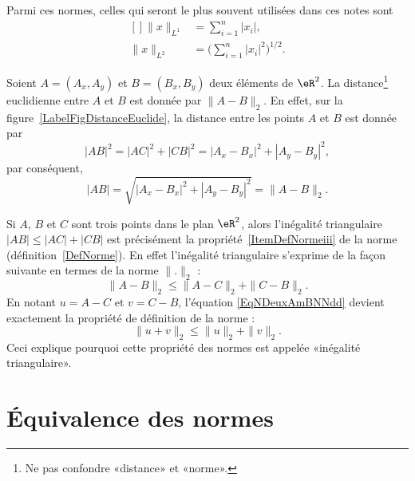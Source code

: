 Parmi ces normes, celles qui seront le plus souvent utilisées dans ces notes sont
\begin{equation}
	\begin{aligned}[]
		\| x \|_{L^1}&=\sum_{i=1}^n| x_i |,\\
		\| x \|_{L^2}&=\Big( \sum_{i=1}^n| x_i |^2 \Big)^{1/2}.
	\end{aligned}
\end{equation}

\newcommand{\CaptionFigDistanceEuclide}{La \emph{norme} euclidienne induit la \emph{distance} euclidienne. D'où son nom. Le point $C$ est construit aux coordonnées $(A_x,B_y)$.}


Soient $A=(A_x,A_y)$ et $B=(B_x,B_y)$ deux éléments de $\eR^2$. La distance\footnote{Ne pas confondre «distance» et «norme».} euclidienne entre $A$ et $B$ est donnée par $\| A-B \|_2$. En effet, sur la figure~\ref{LabelFigDistanceEuclide}, la distance entre les points $A$ et $B$ est donnée par
\begin{equation}
	| AB |^2=| AC |^2+| CB |^2=| A_x-B_x |^2+| A_y-B_y |^2,
\end{equation}
par conséquent,
\begin{equation}
	| AB |=\sqrt{| A_x-B_x |^2+| A_y-B_y |^2}=\| A-B \|_2.
\end{equation}

\begin{remark}
	Si $A$, $B$ et $C$ sont trois points dans le plan $\eR^2$, alors l'inégalité triangulaire $| AB |\leq| AC |+| CB |$ est précisément la propriété~\ref{ItemDefNormeiii} de la norme (définition~\ref{DefNorme}). En effet l'inégalité triangulaire s'exprime de la façon suivante en termes de la norme $\| . \|_2$ :
	\begin{equation}	\label{EqNDeuxAmBNNdd}
		\| A-B \|_2\leq \| A-C \|_2+\| C-B \|_2.
	\end{equation}
	En notant $u=A-C$ et $v=C-B$, l'équation \eqref{EqNDeuxAmBNNdd} devient exactement la propriété de définition de la norme :
	\begin{equation}
		\| u+v \|_2\leq \| u \|_2+\| v \|_2.
	\end{equation}
	Ceci explique pourquoi cette propriété des normes est appelée «inégalité triangulaire».
\end{remark}

\section{Équivalence des normes}
\label{normes_equiv}


